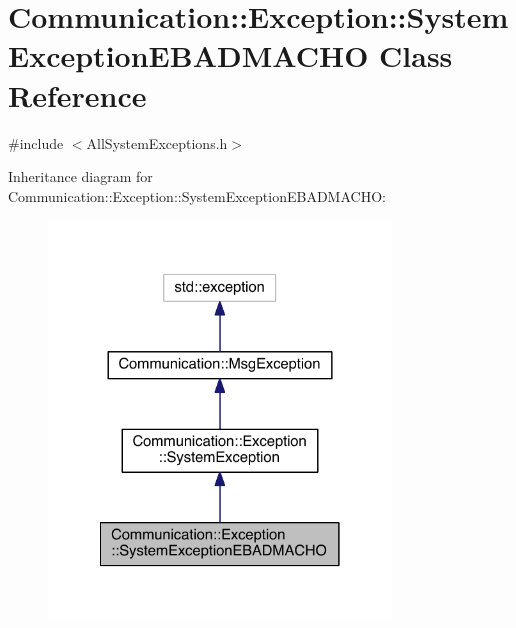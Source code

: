 \hypertarget{class_communication_1_1_exception_1_1_system_exception_e_b_a_d_m_a_c_h_o}{}\section{Communication\+:\+:Exception\+:\+:System\+Exception\+E\+B\+A\+D\+M\+A\+C\+H\+O Class Reference}
\label{class_communication_1_1_exception_1_1_system_exception_e_b_a_d_m_a_c_h_o}


{\ttfamily \#include $<$All\+System\+Exceptions.\+h$>$}



Inheritance diagram for Communication\+:\+:Exception\+:\+:System\+Exception\+E\+B\+A\+D\+M\+A\+C\+H\+O\+:\nopagebreak
\begin{figure}[H]
\begin{center}
\leavevmode
\includegraphics[width=258pt]{class_communication_1_1_exception_1_1_system_exception_e_b_a_d_m_a_c_h_o__inherit__graph}
\end{center}
\end{figure}


